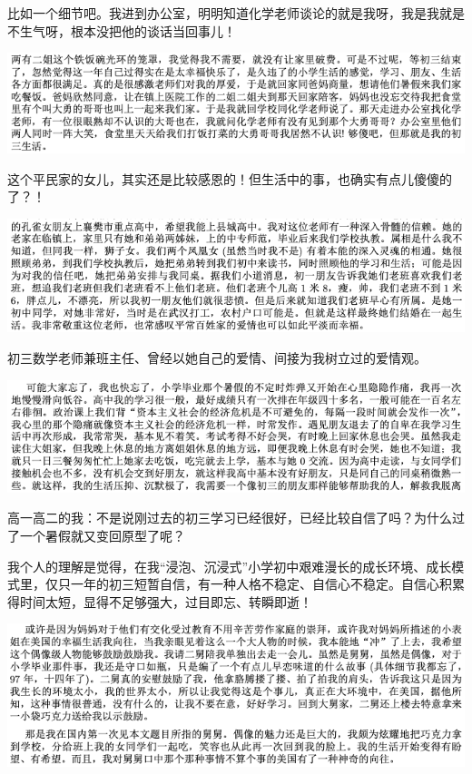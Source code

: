 \documentclass[9pt, b5paper]{article}
\begin{document}
比如一个细节吧。我进到办公室，明明知道化学老师谈论的就是我呀，我是我就是不生气呀，根本没把他的谈话当回事儿！

\begin{center}
\includegraphics[width=.9\linewidth]{./pic/backups_plans_20210422_171112.png}
\end{center}

这个平民家的女儿，其实还是比较感恩的！但生活中的事，也确实有点儿傻傻的了？！

\begin{center}
\includegraphics[width=.9\linewidth]{./pic/backups_plans_20210422_102629.png}
\end{center}

初三数学老师兼班主任、曾经以她自己的爱情、间接为我树立过的爱情观。

\begin{center}
\includegraphics[width=.9\linewidth]{./pic/backups_plans_20210422_171522.png}
\end{center}

高一高二的我：不是说刚过去的初三学习已经很好，已经比较自信了吗？为什么过了一个暑假就又变回原型了呢？

我个人的理解是觉得，在我“浸泡、沉浸式”小学初中艰难漫长的成长环境、成长模式里，仅只一年的初三短暂自信，有一种人格不稳定、自信心不稳定。自信心积累得时间太短，显得不足够强大，过目即忘、转瞬即逝！

\begin{center}
\includegraphics[width=.9\linewidth]{./pic/readme_20210422_172512.png}
\end{center}
\end{document}
